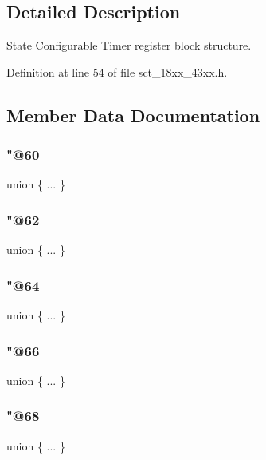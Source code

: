 \subsection{Detailed Description}
State Configurable Timer register block structure. 

Definition at line 54 of file sct\+\_\+18xx\+\_\+43xx.\+h.



\subsection{Member Data Documentation}
\mbox{\label{struct_l_p_c___s_c_t___t_a823a039e38170223b1c60a8ffbb2afc0}} 
\subsubsection{\texorpdfstring{"@60}{@60}}
{\footnotesize\ttfamily union \{ ... \} }

\mbox{\label{struct_l_p_c___s_c_t___t_abce9665b6c86043ed068c9a89b4f3df6}} 
\subsubsection{\texorpdfstring{"@62}{@62}}
{\footnotesize\ttfamily union \{ ... \} }

\mbox{\label{struct_l_p_c___s_c_t___t_a3830e6e822a0c2b9d54f47035d52348f}} 
\subsubsection{\texorpdfstring{"@64}{@64}}
{\footnotesize\ttfamily union \{ ... \} }

\mbox{\label{struct_l_p_c___s_c_t___t_a1b749391855edc85f24ee727f072a7cf}} 
\subsubsection{\texorpdfstring{"@66}{@66}}
{\footnotesize\ttfamily union \{ ... \} }

\mbox{\label{struct_l_p_c___s_c_t___t_adcfd0ff6be20d8a7d5d29ac267bb03da}} 
\subsubsection{\texorpdfstring{"@68}{@68}}
{\footnotesize\ttfamily union \{ ... \} }

